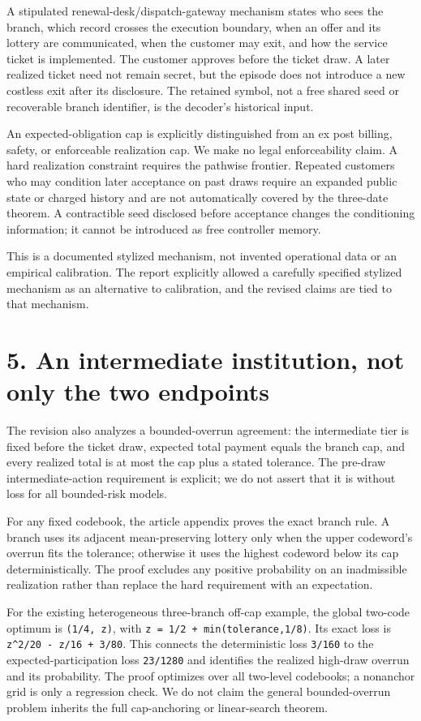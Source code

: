\documentclass[11pt,letterpaper]{article}
\theoremstyle{definition}\newtheorem{assumption}[theorem]{Assumption}
\begin{document}
A stipulated renewal-desk/dispatch-gateway mechanism states who sees the branch, which record crosses the execution boundary, when an offer and its lottery are communicated, when the customer may exit, and how the service ticket is implemented. The customer approves before the ticket draw. A later realized ticket need not remain secret, but the episode does not introduce a new costless exit after its disclosure. The retained symbol, not a free shared seed or recoverable branch identifier, is the decoder's historical input.

An expected-obligation cap is explicitly distinguished from an ex post billing, safety, or enforceable realization cap. We make no legal enforceability claim. A hard realization constraint requires the pathwise frontier. Repeated customers who may condition later acceptance on past draws require an expanded public state or charged history and are not automatically covered by the three-date theorem. A contractible seed disclosed before acceptance changes the conditioning information; it cannot be introduced as free controller memory.

This is a documented stylized mechanism, not invented operational data or an empirical calibration. The report explicitly allowed a carefully specified stylized mechanism as an alternative to calibration, and the revised claims are tied to that mechanism.

\section*{5. An intermediate institution, not only the two endpoints}

The revision also analyzes a bounded-overrun agreement: the intermediate tier is fixed before the ticket draw, expected total payment equals the branch cap, and every realized total is at most the cap plus a stated tolerance. The pre-draw intermediate-action requirement is explicit; we do not assert that it is without loss for all bounded-risk models.

For any fixed codebook, the article appendix proves the exact branch rule. A branch uses its adjacent mean-preserving lottery only when the upper codeword's overrun fits the tolerance; otherwise it uses the highest codeword below its cap deterministically. The proof excludes any positive probability on an inadmissible realization rather than replace the hard requirement with an expectation.

For the existing heterogeneous three-branch off-cap example, the global two-code optimum is \texttt{(1/\allowbreak{}4, z)}, with \texttt{z = 1/\allowbreak{}2 + min(tolerance,1/\allowbreak{}8)}. Its exact loss is \texttt{z\textasciicircum{}2/\allowbreak{}20 -\allowbreak{} z/\allowbreak{}16 + 3/\allowbreak{}80}. This connects the deterministic loss \texttt{3/\allowbreak{}160} to the expected-participation loss \texttt{23/\allowbreak{}1280} and identifies the realized high-draw overrun and its probability. The proof optimizes over all two-level codebooks; a nonanchor grid is only a regression check. We do not claim the general bounded-overrun problem inherits the full cap-anchoring or linear-search theorem.
\end{document}
